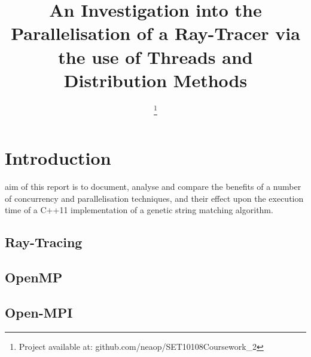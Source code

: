 \documentclass[journal,transmag]{IEEEtran}
\begin{document}
\title{An Investigation into the Parallelisation of a Ray-Tracer via the use of Threads and Distribution Methods}

\author{

\thanks{Project available at: github.com/neaop/SET10108Coursework\_2}}




\maketitle

\IEEEdisplaynontitleabstractindextext

\IEEEpeerreviewmaketitle

\section{Introduction}
 
	 aim of this report is to document, analyse and compare the benefits of a number of concurrency and parallelisation techniques, and their effect upon the execution time of a C++11 implementation of a genetic string matching algorithm.
	
	\subsection{Ray-Tracing}
		\lipsum[1]
	
	\subsection{OpenMP}
		\lipsum[2]
	
	\subsection{Open-MPI}
		\lipsum[3]	
		
\end{document}
